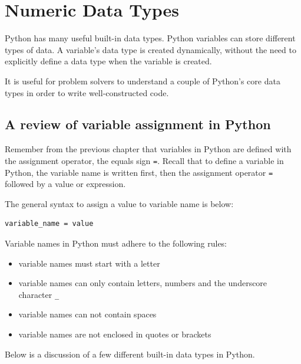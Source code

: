 \documentclass{book}
\providecommand{\tightlist}{%
      \setlength{\itemsep}{0pt}\setlength{\parskip}{0pt}}
\begin{document}
    




    
        \section{Numeric Data Types}\label{numeric-data-types}
    




    
        Python has many useful built-in data types. Python variables can store
different types of data. A variable's data type is created dynamically,
without the need to explicitly define a data type when the variable is
created.

It is useful for problem solvers to understand a couple of Python's core
data types in order to write well-constructed code.

\subsection{A review of variable assignment in
Python}\label{a-review-of-variable-assignment-in-python}

Remember from the previous chapter that variables in Python are defined
with the assignment operator, the equals sign \lstinline!=!. Recall that
to define a variable in Python, the variable name is written first, then
the assignment operator \lstinline!=! followed by a value or expression.

The general syntax to assign a value to variable name is below:

\begin{lstlisting}
variable_name = value
\end{lstlisting}

Variable names in Python must adhere to the following rules:

\begin{itemize}
\tightlist
\item
  variable names must start with a letter
\item
  variable names can only contain letters, numbers and the underscore
  character \lstinline!_!
\item
  variable names can not contain spaces
\item
  variable names are not enclosed in quotes or brackets
\end{itemize}

Below is a discussion of a few different built-in data types in Python.
    
\end{document}
